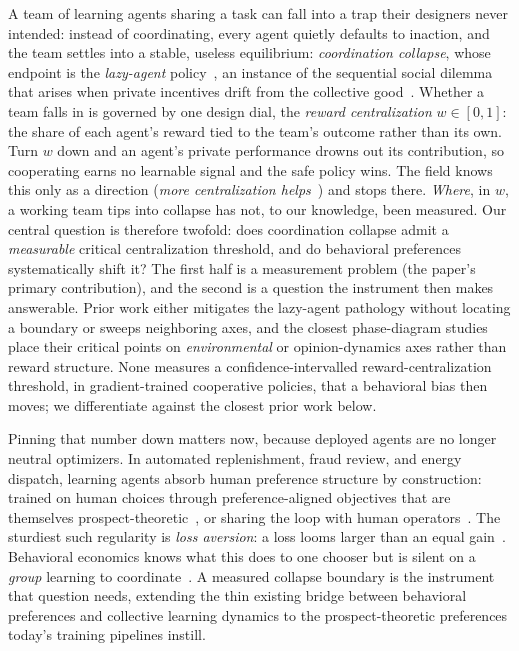 \documentclass[letterpaper]{article} %
\theoremstyle{plain}
\begin{document}
A team of learning agents sharing a task can fall into a trap their designers never intended:
instead of coordinating, every agent quietly defaults to inaction, and the team settles into a
stable, useless equilibrium: \emph{coordination collapse}, whose endpoint is the \emph{lazy-agent}
policy~\citep{liu2023lazy,peng2023curo}, an instance of the sequential social dilemma that arises
when private incentives drift from the collective good~\citep{leibo2017multi}. Whether a team falls
in is governed by one design dial, the \emph{reward centralization} $w\in[0,1]$: the share of each
agent's reward tied to the team's outcome rather than its own. Turn $w$ down and an agent's private performance
drowns out its contribution, so cooperating earns no learnable signal and the safe policy
wins. The field knows this only as a direction (\emph{more centralization
helps}~\citep{dmarl2025,liu2023lazy}) and stops there. \emph{Where}, in $w$, a working team
tips into collapse has not, to our knowledge, been measured. Our central question is therefore twofold: does
coordination collapse admit a \emph{measurable} critical centralization threshold, and do
behavioral preferences systematically shift it? The first half is a measurement problem (the
paper's primary contribution), and the second is a question the instrument then makes answerable. Prior work either mitigates the lazy-agent pathology without locating a boundary or sweeps
neighboring axes, and the closest phase-diagram studies place their critical points on
\emph{environmental} or opinion-dynamics axes rather than reward structure. None measures a
confidence-intervalled reward-centralization threshold, in gradient-trained cooperative policies,
that a behavioral bias then moves; we differentiate against the closest prior work below.

Pinning that number down matters now, because deployed agents are no longer neutral optimizers. In
automated replenishment, fraud review, and energy dispatch, learning agents absorb human preference
structure by construction: trained on human choices through preference-aligned objectives that are
themselves prospect-theoretic~\citep{ethayarajh2024kto}, or sharing the loop with human
operators~\citep{lalmohammed2025}. The sturdiest such regularity is \emph{loss aversion}: a loss
looms larger than an equal gain~\citep{kahneman1979,tversky1992}. Behavioral economics knows what
this does to one chooser but is silent on a \emph{group} learning to
coordinate~\citep{leibo2017multi,lowe2017multi}. A measured collapse boundary is the instrument that
question needs, extending the thin existing bridge between behavioral preferences and collective
learning dynamics to the prospect-theoretic preferences today's training pipelines instill.
\end{document}
